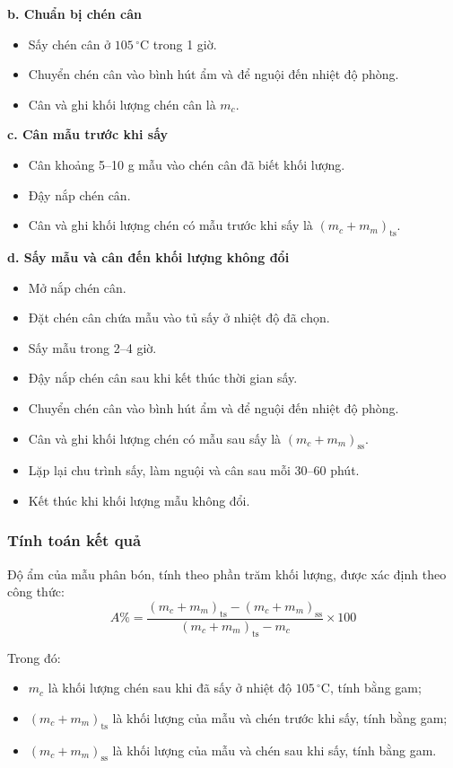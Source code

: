 \noindent\textbf{b. Chuẩn bị chén cân}
\begin{itemize}
  \item Sấy chén cân ở $105\,^{\circ}\mathrm{C}$ trong 1 giờ.
  \item Chuyển chén cân vào bình hút ẩm và để nguội đến nhiệt độ phòng.
  \item Cân và ghi khối lượng chén cân là $m_c$.
\end{itemize}

\noindent\textbf{c. Cân mẫu trước khi sấy}
\begin{itemize}
  \item Cân khoảng 5--10 g mẫu vào chén cân đã biết khối lượng.
  \item Đậy nắp chén cân.
  \item Cân và ghi khối lượng chén có mẫu trước khi sấy là $(m_c+m_m)_{\mathrm{ts}}$.
\end{itemize}

\noindent\textbf{d. Sấy mẫu và cân đến khối lượng không đổi}
\begin{itemize}
  \item Mở nắp chén cân.
  \item Đặt chén cân chứa mẫu vào tủ sấy ở nhiệt độ đã chọn.
  \item Sấy mẫu trong 2--4 giờ.
  \item Đậy nắp chén cân sau khi kết thúc thời gian sấy.
  \item Chuyển chén cân vào bình hút ẩm và để nguội đến nhiệt độ phòng.
  \item Cân và ghi khối lượng chén có mẫu sau sấy là $(m_c+m_m)_{\mathrm{ss}}$.
  \item Lặp lại chu trình sấy, làm nguội và cân sau mỗi 30--60 phút.
  \item Kết thúc khi khối lượng mẫu không đổi.
\end{itemize}

\subsubsection{Tính toán kết quả}
Độ ẩm của mẫu phân bón, tính theo phần trăm khối lượng, được xác định theo công thức:
\[
  A\% = \frac{(m_c+m_m)_{\mathrm{ts}}-(m_c+m_m)_{\mathrm{ss}}}{(m_c+m_m)_{\mathrm{ts}}-m_c} \times 100
\]

Trong đó:
\begin{itemize}
  \item $m_c$ là khối lượng chén sau khi đã sấy ở nhiệt độ $105\,^{\circ}\mathrm{C}$, tính bằng gam;
  \item $(m_c+m_m)_{\mathrm{ts}}$ là khối lượng của mẫu và chén trước khi sấy, tính bằng gam;
  \item $(m_c+m_m)_{\mathrm{ss}}$ là khối lượng của mẫu và chén sau khi sấy, tính bằng gam.
\end{itemize}
